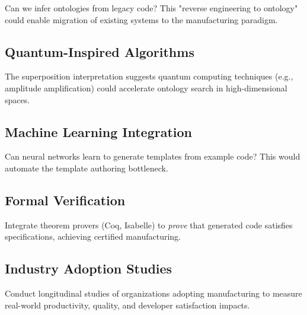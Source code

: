 Can we infer ontologies from legacy code? This "reverse engineering to ontology" could enable migration of existing systems to the manufacturing paradigm.

\subsection{Quantum-Inspired Algorithms}

The superposition interpretation suggests quantum computing techniques (e.g., amplitude amplification) could accelerate ontology search in high-dimensional spaces.

\subsection{Machine Learning Integration}

Can neural networks learn to generate templates from example code? This would automate the template authoring bottleneck.

\subsection{Formal Verification}

Integrate theorem provers (Coq, Isabelle) to \textit{prove} that generated code satisfies specifications, achieving certified manufacturing.

\subsection{Industry Adoption Studies}

Conduct longitudinal studies of organizations adopting manufacturing to measure real-world productivity, quality, and developer satisfaction impacts.

